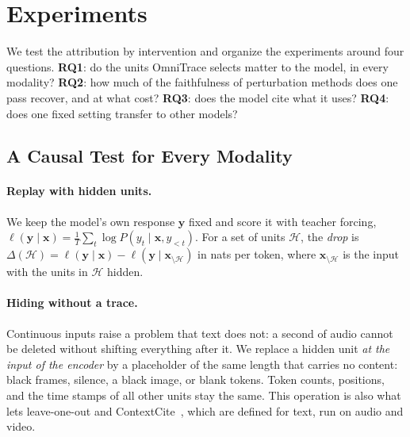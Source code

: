 \section{Experiments}
\label{sec:exp}

We test the attribution by intervention and organize the experiments around four questions.
\textbf{RQ1}: do the units OmniTrace selects matter to the model, in every modality?
\textbf{RQ2}: how much of the faithfulness of perturbation methods does one pass recover, and at what cost?
\textbf{RQ3}: does the model cite what it uses?
\textbf{RQ4}: does one fixed setting transfer to other models?

\subsection{A Causal Test for Every Modality}
\label{sec:protocol}

\paragraph{Replay with hidden units.}
We keep the model's own response $\mathbf{y}$ fixed and score it with teacher forcing, $\ell(\mathbf{y}\mid\mathbf{x})=\frac{1}{T}\sum_t\log P(y_t\mid\mathbf{x},y_{<t})$.
For a set of units $\mathcal{H}$, the \emph{drop} is $\Delta(\mathcal{H})=\ell(\mathbf{y}\mid\mathbf{x})-\ell(\mathbf{y}\mid\mathbf{x}_{\setminus\mathcal{H}})$ in nats per token, where $\mathbf{x}_{\setminus\mathcal{H}}$ is the input with the units in $\mathcal{H}$ hidden.

\paragraph{Hiding without a trace.}
Continuous inputs raise a problem that text does not: a second of audio cannot be deleted without shifting everything after it.
We replace a hidden unit \emph{at the input of the encoder} by a placeholder of the same length that carries no content: black frames, silence, a black image, or blank tokens.
Token counts, positions, and the time stamps of all other units stay the same.
This operation is also what lets leave-one-out and ContextCite~\cite{cohen-wang2024contextcite}, which are defined for text, run on audio and video.

